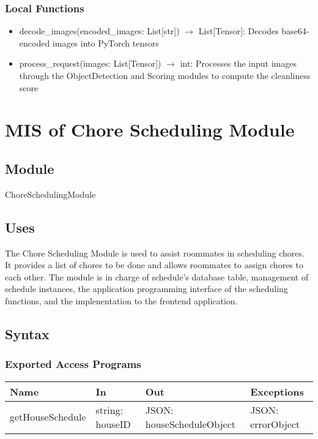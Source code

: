 \documentclass[12pt, titlepage]{article}
\begin{document}
\subsubsection{Local Functions}

\begin{itemize}
  \item decode{\_}images(encoded{\_}images: List[str]) $\rightarrow$ List[Tensor]: Decodes base64-encoded images into PyTorch tensors
  \item process{\_}request(images: List[Tensor]) $\rightarrow$ int: Processes the input images through the ObjectDetection and Scoring modules to compute the cleanliness score
\end{itemize}

\newpage


\section{MIS of Chore Scheduling Module} \label{Module} 

\subsection{Module}

ChoreSchedulingModule

\subsection{Uses}
The Chore Scheduling Module is used to assist roommates in scheduling chores. It provides a list of chores to be done and allows roommates to assign chores to each other. The module is in charge of schedule's database table, management of schedule instances, the application programming interface of the scheduling functions, and the implenentation to the frontend application. 

\subsection{Syntax}

\subsubsection{Exported Access Programs}

\begin{center}
\begin{tabular}{p{4cm} p{3cm} p{5cm} p{3.5cm}}
\hline
\textbf{Name} & \textbf{In} & \textbf{Out} & \textbf{Exceptions} \\
\hline
getHouseSchedule & string: houseID & JSON: houseScheduleObject & JSON: errorObject \\
\hline
\end{tabular}
\end{center}
\end{document}
